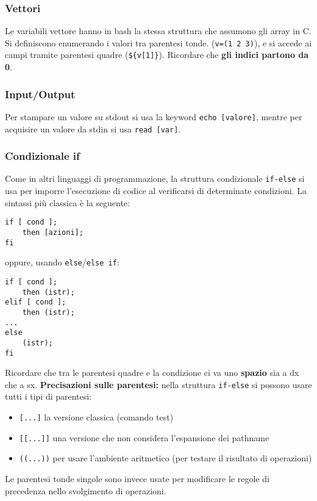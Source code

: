 \documentclass[a4paper]{article}
\begin{document}
\subsubsection{Vettori}
Le variabili vettore hanno in bash la stessa struttura che assumono gli array in C. Si definiscono enumerando i valori tra parentesi tonde. (\verb|v=(1 2 3)|), e si accede ai campi tramite parentesi quadre (\verb|${v[1]}|). 
Ricordare che \textbf{gli indici partono da 0}.

\subsubsection{Input/Output} Per stampare un valore su stdout si usa la keyword \verb|echo [valore]|, mentre per acquisire un valore da stdin si usa \verb|read [var]|.

\subsubsection{Condizionale if}
Come in altri linguaggi di programmazione, la struttura condizionale \verb|if-else| si usa per imporre l'esecuzione di codice al verificarsi di determinate condizioni. La sintassi più classica è la seguente:
\begin{verbatim}
if [ cond ];
    then [azioni];
fi
\end{verbatim} oppure, usando \verb|else|/\verb|else if|:
\begin{verbatim}
if [ cond ];
    then (istr);
elif [ cond ];
    then (istr);
...
else
    (istr);
fi
\end{verbatim}

Ricordare che tra le parentesi quadre e la condizione ci va uno \textbf{spazio} sia a dx che a sx.
\textbf{Precisazioni sulle parentesi:} nella struttura \verb|if-else| si possono usare tutti i tipi di parentesi:
\begin{itemize}
\item \verb|[...]| la versione classica (comando test)
\item \verb|[[...]]| una versione che non considera l'espansione dei pathname
\item \verb|((...))| per usare l'ambiente aritmetico (per testare il risultato di operazioni)
\end{itemize}
Le parentesi tonde singole sono invece usate per modificare le regole di precedenza nello svolgimento di operazioni.
\end{document}
